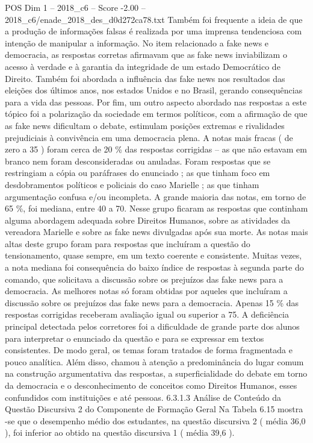 \begin{textsample}{POS Dim 1 – 2018\_c6 – Score -2.00 – 2018\_c6/enade\_2018\_des\_d0d272ca78.txt}
Também foi frequente a ideia de que a produção de informações falsas é realizada por uma imprensa tendenciosa com intenção de manipular a informação.
No item relacionado a fake news e democracia, as respostas corretas afirmavam que as fake news inviabilizam o acesso à verdade e à garantia da integridade de um estado Democrático de Direito.
Também foi abordada a influência das fake news nos resultados das eleições dos últimos anos, nos estados Unidos e no Brasil, gerando consequências para a vida das pessoas.
Por fim, um outro aspecto abordado nas respostas a este tópico foi a polarização da sociedade em termos políticos, com a afirmação de que as fake news dificultam o debate, estimulam posições extremas e rivalidades prejudiciais à convivência em uma democracia plena.
A notas mais fracas ( de zero a 35 ) foram cerca de 20 \% das respostas corrigidas – as que não estavam em branco nem foram desconsideradas ou anuladas.
Foram respostas que se restringiam a cópia ou paráfrases do enunciado ; as que tinham foco em desdobramentos políticos e policiais do caso Marielle ; as que tinham argumentação confusa e/ou incompleta.
A grande maioria das notas, em torno de 65 \%, foi mediana, entre 40 a 70.
Nesse grupo ficaram as respostas que continham alguma abordagem adequada sobre Direitos Humanos, sobre as atividades da vereadora Marielle e sobre as fake news divulgadas após sua morte.
As notas mais altas deste grupo foram para respostas que incluíram a questão do tensionamento, quase sempre, em um texto coerente e consistente.
Muitas vezes, a nota mediana foi consequência do baixo índice de respostas à segunda parte do comando, que solicitava a discussão sobre os prejuízos das fake news para a democracia.
As melhores notas só foram obtidas por aqueles que incluíram a discussão sobre os prejuízos das fake news para a democracia.
Apenas 15 \% das respostas corrigidas receberam avaliação igual ou superior a 75.
A deficiência principal detectada pelos corretores foi a dificuldade de grande parte dos alunos para interpretar o enunciado da questão e para se expressar em textos consistentes.
De modo geral, os temas foram tratados de forma fragmentada e pouco analítica.
Além disso, chamou à atenção a predominância do lugar comum na construção argumentativa das respostas, a superficialidade do debate em torno da democracia e o desconhecimento de conceitos como Direitos Humanos, esses confundidos com instituições e até pessoas. 6.3.1.3 Análise de Conteúdo da Questão Discursiva 2 do Componente de Formação Geral Na Tabela 6.15 mostra -se que o desempenho médio dos estudantes, na questão discursiva 2 ( média 36,0 ), foi inferior ao obtido na questão discursiva 1 ( média 39,6 ).

\end{textsample}
